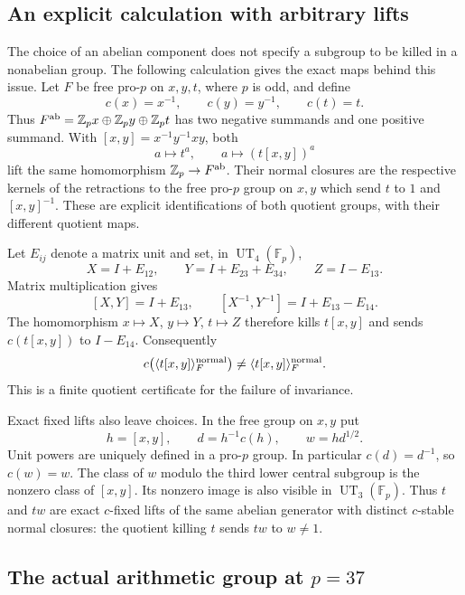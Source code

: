 \documentclass[11pt]{article}
\theoremstyle{definition}\newtheorem{definition}[theorem]{Definition}
\begin{document}
\subsection{An explicit calculation with arbitrary lifts}

The choice of an abelian component does not specify a subgroup to be
killed in a nonabelian group.  The following calculation gives the
exact maps behind this issue.  Let $F$ be free pro-$p$ on $x,y,t$, where
$p$ is odd, and define
\[
 c(x)=x^{-1},\qquad c(y)=y^{-1},\qquad c(t)=t.
\]
Thus $F^{\rm ab}=\mathbb Z_p x\oplus\mathbb Z_p y\oplus\mathbb Z_p t$
has two negative summands and one positive summand.  With
$[x,y]=x^{-1}y^{-1}xy$, both
\[
 a\longmapsto t^a,\qquad
 a\longmapsto(t[x,y])^a
\]
lift the same homomorphism $\mathbb Z_p\to F^{\rm ab}$.
Their normal closures are the respective kernels of the retractions
to the free pro-$p$ group on $x,y$ which send $t$ to $1$ and
$[x,y]^{-1}$.  These are explicit identifications of both quotient
groups, with their different quotient maps.

Let $E_{ij}$ denote a matrix unit and set, in
$\operatorname{UT}_4(\mathbb F_p)$,
\[
 X=I+E_{12},\qquad Y=I+E_{23}+E_{34},\qquad Z=I-E_{13}.
\]
Matrix multiplication gives
\[
 [X,Y]=I+E_{13},\qquad
 [X^{-1},Y^{-1}]=I+E_{13}-E_{14}.
\]
The homomorphism $x\mapsto X$, $y\mapsto Y$, $t\mapsto Z$
therefore kills $t[x,y]$ and sends $c(t[x,y])$ to $I-E_{14}$.
Consequently
\begin{equation}\label{eq:component-raw-lift}
 c\bigl(\langle t[x,y]\rangle_F^{\rm normal}\bigr)
 \ne\langle t[x,y]\rangle_F^{\rm normal}.
\end{equation}
This is a finite quotient certificate for the failure of invariance.

Exact fixed lifts also leave choices.  In the free group on $x,y$ put
\[
 h=[x,y],\qquad d=h^{-1}c(h),\qquad w=h d^{1/2}.
\]
Unit powers are uniquely defined in a pro-$p$ group.  In particular
$c(d)=d^{-1}$, so $c(w)=w$.  The class of $w$ modulo the third lower
central subgroup is the nonzero class of $[x,y]$.  Its nonzero image
is also visible in $\operatorname{UT}_3(\mathbb F_p)$.
Thus $t$ and $tw$ are exact $c$-fixed lifts of the same abelian
generator with distinct $c$-stable normal closures: the quotient
killing $t$ sends $tw$ to $w\ne1$.

\subsection{The actual arithmetic group at $p=37$}
\end{document}
